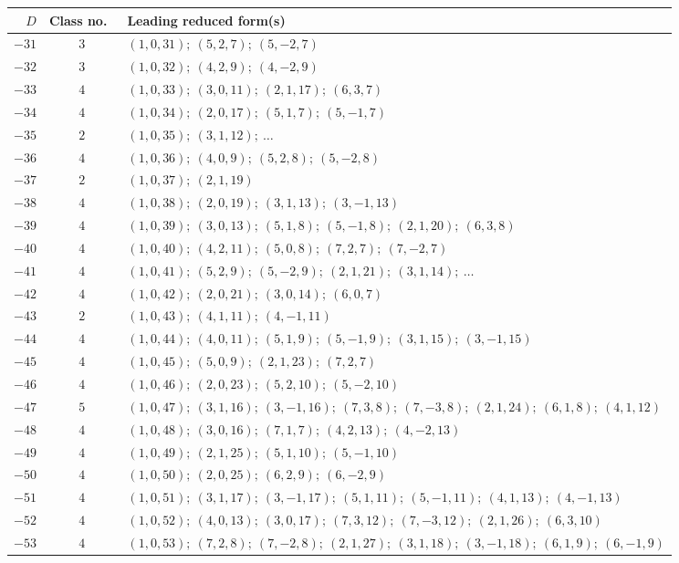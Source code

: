 \documentclass[11pt,a4paper]{article}
\theoremstyle{plain}
\begin{document}
\begin{longtable}{r|c|p{}}
$D$ & Class no.\ & Leading reduced form(s) \\
\hline
\endhead
$-31$ & $3$ & $(1,0,31);\ (5,2,7);\ (5,-2,7)$ \\
$-32$ & $3$ & $(1,0,32);\ (4,2,9);\ (4,-2,9)$ \\
$-33$ & $4$ & $(1,0,33);\ (3,0,11);\ (2,1,17);\ (6,3,7)$ \\
$-34$ & $4$ & $(1,0,34);\ (2,0,17);\ (5,1,7);\ (5,-1,7)$ \\
$-35$ & $2$ & $(1,0,35);\ (3,1,12);\ \ldots$ \\
$-36$ & $4$ & $(1,0,36);\ (4,0,9);\ (5,2,8);\ (5,-2,8)$ \\
$-37$ & $2$ & $(1,0,37);\ (2,1,19)$ \\
$-38$ & $4$ & $(1,0,38);\ (2,0,19);\ (3,1,13);\ (3,-1,13)$ \\
$-39$ & $4$ & $(1,0,39);\ (3,0,13);\ (5,1,8);\ (5,-1,8);\ (2,1,20);\ (6,3,8)$ \\
$-40$ & $4$ & $(1,0,40);\ (4,2,11);\ (5,0,8);\ (7,2,7);\ (7,-2,7)$ \\
$-41$ & $4$ & $(1,0,41);\ (5,2,9);\ (5,-2,9);\ (2,1,21);\ (3,1,14);\ \ldots$ \\
$-42$ & $4$ & $(1,0,42);\ (2,0,21);\ (3,0,14);\ (6,0,7)$ \\
$-43$ & $2$ & $(1,0,43);\ (4,1,11);\ (4,-1,11)$ \\
$-44$ & $4$ & $(1,0,44);\ (4,0,11);\ (5,1,9);\ (5,-1,9);\ (3,1,15);\ (3,-1,15)$ \\
$-45$ & $4$ & $(1,0,45);\ (5,0,9);\ (2,1,23);\ (7,2,7)$ \\
$-46$ & $4$ & $(1,0,46);\ (2,0,23);\ (5,2,10);\ (5,-2,10)$ \\
$-47$ & $5$ & $(1,0,47);\ (3,1,16);\ (3,-1,16);\ (7,3,8);\ (7,-3,8);\ (2,1,24);\ (6,1,8);\ (4,1,12)$ \\
$-48$ & $4$ & $(1,0,48);\ (3,0,16);\ (7,1,7);\ (4,2,13);\ (4,-2,13)$ \\
$-49$ & $4$ & $(1,0,49);\ (2,1,25);\ (5,1,10);\ (5,-1,10)$ \\
$-50$ & $4$ & $(1,0,50);\ (2,0,25);\ (6,2,9);\ (6,-2,9)$ \\
$-51$ & $4$ & $(1,0,51);\ (3,1,17);\ (3,-1,17);\ (5,1,11);\ (5,-1,11);\ (4,1,13);\ (4,-1,13)$ \\
$-52$ & $4$ & $(1,0,52);\ (4,0,13);\ (3,0,17);\ (7,3,12);\ (7,-3,12);\ (2,1,26);\ (6,3,10)$ \\
$-53$ & $4$ & $(1,0,53);\ (7,2,8);\ (7,-2,8);\ (2,1,27);\ (3,1,18);\ (3,-1,18);\ (6,1,9);\ (6,-1,9)$ \\

\end{longtable}
\end{document}
